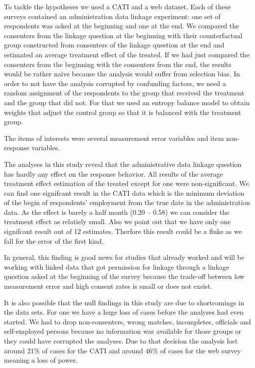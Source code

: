 To tackle the hypotheses we used a CATI and a web dataset. Each of these surveys contained an administration data linkage experiment: one set of respondents was asked at the beginning and one at the end. We compared the consenters from the linkage question at the beginning with their counterfactual group constructed from consenters of the linkage question at the end and estimated an average treatment effect of the treated. If we had just compared the consenters from the beginning with the consenters from the end, the results would be rather naive because the analysis would suffer from selection bias. In order to not have the analysis corrupted by confunding factors, we need a random assignment of the respondents to the group that received the treatment and the group that did not. For that we used an entropy balance model to obtain weights that adjust the control group so that it is balanced with the treatment group.

The items of interests were several measurement error variables and item non-response variables.

The analyses in this study reveal that the administrative data linkage question has hardly any effect on the response behavior. All results of the average treatment effect estimation of the treated except for one were non-significant. We can find one signifcant result in the CATI data which is the minimum deviation of the begin of respondents' employment from the true date in the administration data. As the effect is barely a half month (0.20 -- 0.58) we can consider the treatment effect as relatiely small. Also we point out that we have only one signifcant result out of 12 estimates. Therfore this result could be a fluke as we fall for the error of the first kind.

In general, this finding is good news for studies that already worked and will be working with linked data that got permission for linkage through a linkage question asked at the beginning of the survey because the trade-off between low measurement error and high consent rates is small or does not exsist.

It is also possible that the null findings in this study are due to shortcomings in the data sets. For one we have a huge loss of cases before the analyses had even started. We had to drop non-consenters, wrong matches, incompletes, officials and self-employed persons because no information was available for those groups or they could have corrupted the analyses. Due to that decision the analysis lost around 21\% of cases for the CATI and around 46\% of cases for the web survey meaning a loss of power.

